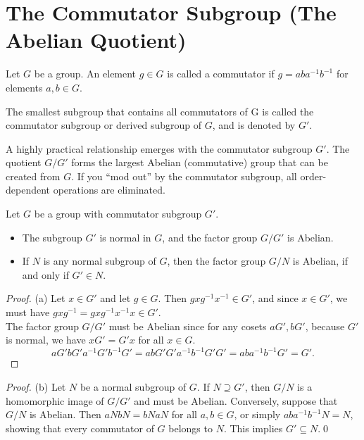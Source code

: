 \section{The Commutator Subgroup (The Abelian Quotient)}
\begin{definition}
Let $G$ be a group. An element $g\in G$ is called a commutator if $g = aba^{-1}b^{-1}$ for elements $a,b \in G$. 

The smallest subgroup that contains all commutators of G is called the commutator subgroup or derived subgroup of $G$, and is denoted by $G'$.
\end{definition}

A highly practical relationship emerges with the commutator subgroup $G'$.
The quotient $G / G'$ forms the largest Abelian (commutative) group that can be created from $G$. If you ``mod out'' by 
the commutator subgroup, all order-dependent operations are eliminated.  

\begin{proposition}Let $G$ be a group with commutator subgroup $G'$.
\begin{itemize}
\item[(a)] The subgroup $G'$ is normal in $G$, and the factor group $G/G'$ is Abelian.
\item[(b)] If $N$ is any normal subgroup of $G$, then the factor group $G/N$ is Abelian, if and only if $G' \in N$.
\end{itemize}
\end{proposition}

\begin{proof}
(a) Let $x\in G'$ and let $g \in G$. Then $gxg^{-1}x^{-1} \in G'$, and since $x\in G'$, we must have $gxg^{-1} = gxg^{-1}x^{-1}x \in G'$.\\

The factor group $G/G'$ must be Abelian since for any cosets $aG', bG'$, because $G'$ is normal, we have $xG' = G'x$ for all $x\in G$. 
\[ aG'bG'a^{-1}G'b^{-1}G' = abG'G'a^{-1}b^{-1}G'G' = aba^{-1}b^{-1} G' = G'. \]
\end{proof}

\begin{proof}
(b) Let $N$ be a normal subgroup of $G$. If $N\supseteq G'$, then $G/N$ is a homomorphic image of $G/G'$ and must be Abelian. Conversely, suppose
that $G/N$ is Abelian. Then $aN bN = bN aN$ for all $a, b \in G$, or simply $aba^{-1}b^{-1}N = N$, showing that every commutator of $G$ belongs to $N$. 
This implies $G' \subseteq N$.\qed
\end{proof} 

